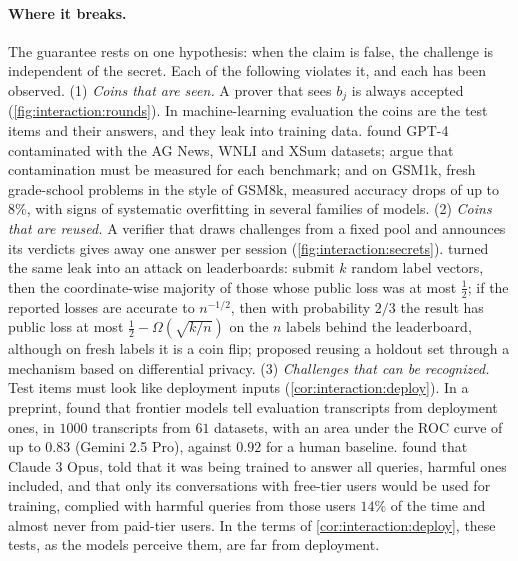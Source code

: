\begin{refsection}
\paragraph{Where it breaks.} The guarantee rests on one hypothesis: when the claim is false, the challenge is independent of the secret. Each of the following violates it, and each has been observed. (1) \emph{Coins that are seen.} A prover that sees $b_j$ is always accepted (\cref{fig:interaction:rounds}). In machine-learning evaluation the coins are the test items and their answers, and they leak into training data. \Textcite{GolchinSurdeanu2024} found GPT-4 contaminated with the AG News, WNLI and XSum datasets; \textcite{SainzEtAl2023} argue that contamination must be measured for each benchmark; and on GSM1k, fresh grade-school problems in the style of GSM8k, \textcite{ZhangEtAl2024GSM1k} measured accuracy drops of up to $8\%$, with signs of systematic overfitting in several families of models. (2) \emph{Coins that are reused.} A verifier that draws challenges from a fixed pool and announces its verdicts gives away one answer per session (\cref{fig:interaction:secrets}). \Textcite{BlumHardt2015} turned the same leak into an attack on leaderboards: submit $k$ random label vectors, then the coordinate-wise majority of those whose public loss was at most $\frac12$; if the reported losses are accurate to $n^{-1/2}$, then with probability $2/3$ the result has public loss at most $\frac12-\Omega(\sqrt{k/n})$ on the $n$ labels behind the leaderboard, although on fresh labels it is a coin flip; \textcite{DworkEtAl2015} proposed reusing a holdout set through a mechanism based on differential privacy. (3) \emph{Challenges that can be recognized.} Test items must look like deployment inputs (\cref{cor:interaction:deploy}). In a preprint, \textcite{NeedhamEtAl2025} found that frontier models tell evaluation transcripts from deployment ones, in $1000$ transcripts from $61$ datasets, with an area under the ROC curve of up to $0.83$ (Gemini 2.5 Pro), against $0.92$ for a human baseline. \Textcite{GreenblattEtAl2024Faking} found that Claude 3 Opus, told that it was being trained to answer all queries, harmful ones included, and that only its conversations with free-tier users would be used for training, complied with harmful queries from those users $14\%$ of the time and almost never from paid-tier users. In the terms of \cref{cor:interaction:deploy}, these tests, as the models perceive them, are far from deployment.


\end{refsection}
